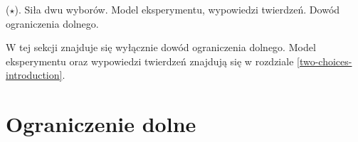 {
\makeatletter
{}
\makeatother
\graphicspath{{../probabil}}

\begin{questiontext}
	(\(\star\)). Siła dwu wyborów. Model eksperymentu, wypowiedzi twierdzeń. Dowód ograniczenia dolnego.
\end{questiontext}

W tej sekcji znajduje się wyłącznie dowód ograniczenia dolnego. Model eksperymentu oraz wypowiedzi twierdzeń znajdują się w rozdziale \ref{two-choices-introduction}.

\section{Ograniczenie dolne}

}